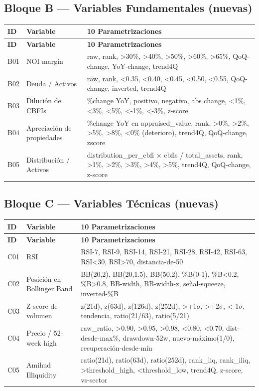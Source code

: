 \documentclass[12pt,letterpaper]{article}
\begin{document}
\subsection{Bloque B — Variables Fundamentales (nuevas)}

\begin{longtable}{p{0.8cm} p{4.5cm} p{9cm}}
\toprule
\textbf{ID} & \textbf{Variable} & \textbf{10 Parametrizaciones} \\
\midrule
\endfirsthead
\toprule \textbf{ID} & \textbf{Variable} & \textbf{10 Parametrizaciones} \\ \midrule
\endhead \bottomrule \endfoot
B01 & NOI margin & raw, rank, >30\%, >40\%, >50\%, >60\%, >65\%, QoQ-change, YoY-change, trend4Q \\[3pt]
B02 & Deuda / Activos & raw, rank, <0.35, <0.40, <0.45, <0.50, <0.55, QoQ-change, inverted, trend4Q \\[3pt]
B03 & Dilución de CBFIs & \%change YoY, positivo, negativo, abs change, <1\%, <3\%, <5\%, <-1\%, <-3\%, z-score \\[3pt]
B04 & Apreciación de propiedades & \%change YoY en appraised\_value, rank, >0\%, >2\%, >5\%, >8\%, <0\% (deterioro), trend4Q, QoQ-change, zscore \\[3pt]
B05 & Distribución / Activos & distribution\_per\_cbfi × cbfis / total\_assets, rank, >1\%, >2\%, >3\%, >4\%, >5\%, trend4Q, QoQ-change, z-score \\
\end{longtable}

\subsection{Bloque C — Variables Técnicas (nuevas)}

\begin{longtable}{p{0.8cm} p{4.5cm} p{9cm}}
\toprule
\textbf{ID} & \textbf{Variable} & \textbf{10 Parametrizaciones} \\
\midrule
\endfirsthead
\toprule \textbf{ID} & \textbf{Variable} & \textbf{10 Parametrizaciones} \\ \midrule
\endhead \bottomrule \endfoot
C01 & RSI & RSI-7, RSI-9, RSI-14, RSI-21, RSI-28, RSI-42, RSI-63, RSI<30, RSI>70, distancia-de-50 \\[3pt]
C02 & Posición en Bollinger Band & BB(20,2), BB(20,1.5), BB(50,2), \%B(0-1), \%B<0.2, \%B>0.8, BB-width, BB-width-z, señal-squeeze, inverted-\%B \\[3pt]
C03 & Z-score de volumen & z(21d), z(63d), z(126d), z(252d), >+1$\sigma$, >+2$\sigma$, <-1$\sigma$, tendencia, ratio(21/63), ratio(5/21) \\[3pt]
C04 & Precio / 52-week high & raw\_ratio, >0.90, >0.95, >0.98, <0.80, <0.70, dist-desde-max\%, drawdown-52w, nuevo-máximo(1/0), recuperación-desde-mín \\[3pt]
C05 & Amihud Illiquidity & ratio(21d), ratio(63d), ratio(252d), rank\_liq, rank\_iliq, >threshold\_high, <threshold\_low, trend4Q, z-score, vs-sector \\
\end{longtable}
\end{document}
